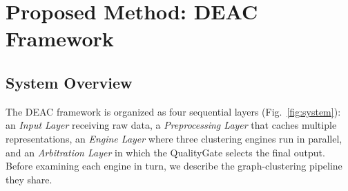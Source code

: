\documentclass[conference]{IEEEtran}
\begin{document}
\section{Proposed Method: DEAC Framework}\label{sec:method}

\subsection{System Overview}

The DEAC framework is organized as four sequential layers (Fig.~\ref{fig:system}): an \emph{Input Layer} receiving raw data, a \emph{Preprocessing Layer} that caches multiple representations, an \emph{Engine Layer} where three clustering engines run in parallel, and an \emph{Arbitration Layer} in which the QualityGate selects the final output. Before examining each engine in turn, we describe the graph-clustering pipeline they share.
\end{document}
